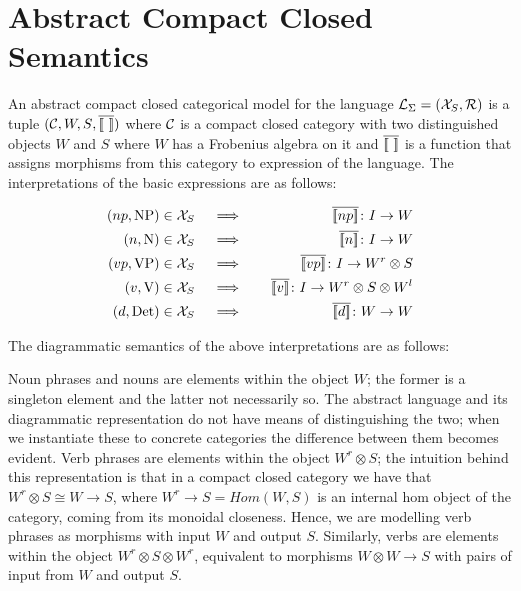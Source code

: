 \section{Abstract Compact Closed Semantics}


An abstract compact closed categorical model for the language  ${\cal L}_{\Sigma} = ({\cal X}_S, {\cal R})$  is  a tuple $({\cal C}, {W,S}, \overline{[\![ \  ]\!]})$ where  ${\cal C}$  is a compact closed category  with two distinguished objects $W$ and $S$ where  $W$ has a Frobenius algebra on it and $\overline{[\![ \  ]\!]}$ is a function that   assigns  morphisms from this category to  expression of the language. The interpretations of  the basic expressions  are as follows:

\begin{eqnarray*}
(np, \text{NP}) \in {\cal X}_S   &\quad \implies \quad& \overline{\semantics{np}} \colon I \to W \\
(n, \text{N}) \in {\cal X}_S   &\quad \implies \quad& \overline{\semantics{n}} \colon I \to W \\
(vp,  \text{VP}) \in {\cal X}_S &\quad \implies \quad& \overline{\semantics{vp}}   \colon I \to W^r \otimes S \\
(v, \text{V}) \in {\cal X}_S &\quad \implies \quad& \overline{\semantics{v}}  \colon I \to W^r \otimes S \otimes W^l  \\
(d, \text{Det}) \in  {\cal X}_S & \quad \implies \quad & \overline{\semantics{d}} \colon W \to W
\end{eqnarray*}

\noindent
The diagrammatic semantics of the above interpretations are as follows:

\begin{center}
 \qquad {} \qquad {}
\end{center}

\noindent
Noun phrases and nouns are elements  within the  object $W$; the former is a singleton element and the latter not necessarily so.  The abstract language and its diagrammatic representation do not have means of distinguishing the two;  when we instantiate these to concrete categories the difference between them becomes evident. Verb phrases are elements within the object $W^r \otimes S$; the intuition behind this representation is that in a compact closed category we have that $W^r \otimes S \cong W \to S$, where $W^r \to S = Hom(W,S)$ is an internal hom object of the category, coming from its monoidal closeness.  Hence,  we are modelling verb phrases as morphisms  with  input $W$ and  output $S$. Similarly, verbs are elements within the object $W^r \otimes S \otimes W^r$, equivalent to morphisms $W \otimes W \to S$ with pairs of  input  from $W$ and output  $S$. 


